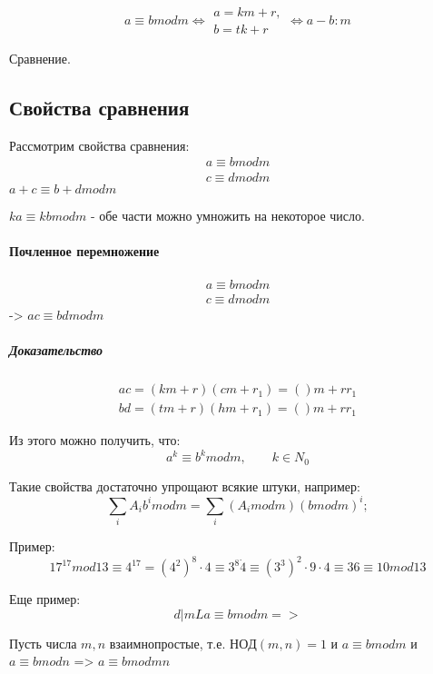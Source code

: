 $$ a\equiv b mod m 
\Longleftrightarrow 
	\begin{array}{c}
		a=km+r, \\
		b=tk+r 
	\end{array}
\Longleftrightarrow 
a-b : m $$

Сравнение. 
\subsection{Свойства сравнения}
Рассмотрим свойства сравнения:
\begin{eqnarray}
a\equiv b mod m\\
c\equiv d mod m
\end{eqnarray}
$ a+c \equiv b+d mod m $


$ ka \equiv kb mod m $ - обе части можно умножить на некоторое число.

\paragraph{Почленное перемножение}
\begin{eqnarray}
a\equiv b mod m\\
c\equiv d mod m
\end{eqnarray}
-> 
$ ac \equiv bd mod m $
\subparagraph{Доказательство}
\begin{eqnarray}
	ac = (km+r)(cm + r_1) = ()m+rr_1 \\
	bd = (tm+r)(hm + r_1) = ()m+rr_1
\end{eqnarray}

Из этого можно получить, что:
\begin{equation}
	a^k \equiv b^k mod m, \qquad k\in N_0
\end{equation}

Такие свойства достаточно упрощают всякие штуки, например:
\begin{equation}
	\sum_i {A_i b^i} mod m = \sum_i(A_i mod m)(b mod m)^i;
\end{equation}

Пример:
\begin{equation}
	17^{17} mod 13 \equiv
	4^{17} = (4^2)^8 \cdot 4 \equiv
	3^8\dot 4 \equiv
	(3^3)^2 \cdot 9 \cdot 4 \equiv
	36 \equiv 10 mod 13
\end{equation}

Еще пример:
\begin{equation}
 d|mL
 a \equiv b mod m => 
\end{equation}

Пусть числа $ m, n $ взаимнопростые, т.е. $ НОД(m,n) = 1 $ и $ a \equiv b mod m $ и $ a \equiv b mod n $ => $ a \equiv b mod mn $




